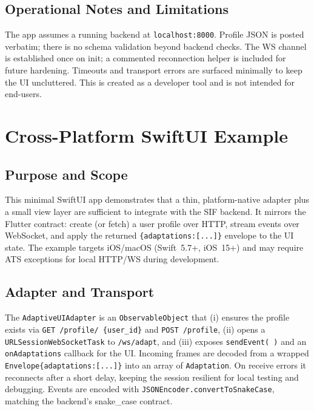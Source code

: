 \subsection{Operational Notes and Limitations}
The app assumes a running backend at \texttt{localhost:8000}. Profile JSON is posted verbatim; there is no schema validation beyond backend checks. The WS channel is established once on init; a commented reconnection helper is included for future hardening. Timeouts and transport errors are surfaced minimally to keep the UI uncluttered. This is created as a developer tool and is not intended for end-users.

\section{Cross-Platform SwiftUI Example}

\subsection{Purpose and Scope}
This minimal SwiftUI app demonstrates that a thin, platform-native adapter plus a small view layer are sufficient to integrate with the SIF backend. It mirrors the Flutter contract: create (or fetch) a user profile over HTTP, stream events over WebSocket, and apply the returned \texttt{\{adaptations:[...]\}} envelope to the UI state. The example targets iOS/macOS (Swift~5.7+, iOS~15+) and may require ATS exceptions for local HTTP/WS during development.

\subsection{Adapter and Transport}
The \texttt{AdaptiveUIAdapter} is an \texttt{ObservableObject} that (i) ensures the profile exists via \texttt{GET /profile/
\{user\_id\}} and \texttt{POST /profile}, (ii) opens a \texttt{URLSessionWebSocketTask} to \texttt{/ws/adapt}, and (iii) exposes \texttt{sendEvent(\,)} and an \texttt{onAdaptations} callback for the UI. Incoming frames are decoded from a wrapped
 \texttt{Envelope\{adaptations:[...]\}} into an array of \texttt{Adaptation}. On receive errors it reconnects after a short delay, keeping the session resilient for local testing and debugging. Events are encoded with \texttt{JSONEncoder.convertToSnakeCase}, matching the backend’s snake\_case contract.

